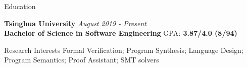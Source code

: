 \documentclass{resume} %
\newcommand{\Aug}{August }
\begin{document}

\begin{rSection}{Education}


{\bf Tsinghua University} \hfill {\em \Aug 2019 - Present} 
\\{\bf Bachelor of Science in Software Engineering} \hfill{GPA:\bf{ 3.87/4.0} (8/94)}


\end{rSection}

\begin{rSection}{Research Interests}
Formal Verification; Program Synthesis; Language Design; Program Semantics; Proof Assistant; SMT solvers

\end{rSection}



    
\end{document}
